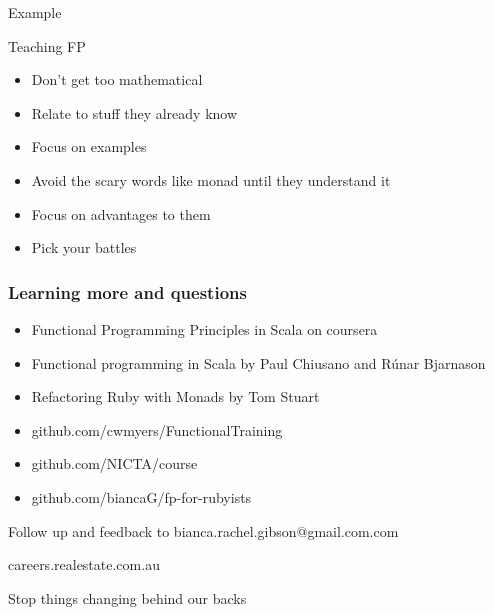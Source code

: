 \documentclass[aspectratio=169]{beamer}
\begin{document}
\begin{frame}
  \begin{center}
    \Huge Example
  \end{center}
\end{frame}

\begin{frame}
  \begin{center}
    \Huge Teaching FP
  \end{center}
  \begin{itemize}
    \item Don't get too mathematical
    \item Relate to stuff they already know
    \item Focus on examples
    \item Avoid the scary words like monad until they understand it
    \item Focus on advantages to them
    \item Pick your battles
  \end{itemize}
\end{frame}

\begin{frame}
  \frametitle{Learning more and questions}
  \begin{itemize}
    \item Functional Programming Principles in Scala on coursera
    \item Functional programming in Scala by Paul Chiusano and Rúnar Bjarnason
    \item Refactoring Ruby with Monads by Tom Stuart
    \item github.com/cwmyers/FunctionalTraining
    \item github.com/NICTA/course
    \item github.com/biancaG/fp-for-rubyists
  \end{itemize}
\end{frame}

\begin{frame}
  \begin{center}
    \Huge Follow up and feedback to bianca.rachel.gibson@gmail.com.com
  \end{center}
\end{frame}

\begin{frame}
  \begin{center}
    \Huge careers.realestate.com.au
  \end{center}
\end{frame}

\begin{frame}
  \begin{center}
    \Huge Stop things changing behind our backs
  \end{center}
\end{frame}
\end{document}
